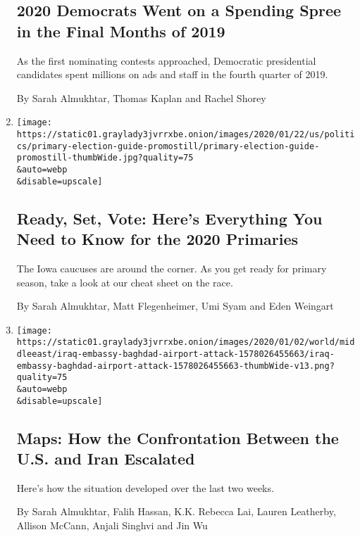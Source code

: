 \begin{enumerate}
  \hypertarget{2020-democrats-went-on-a-spending-spree-in-the-final-months-of-2019}{%
  \subsection{2020 Democrats Went on a Spending Spree in the Final
  Months of
  2019}\label{2020-democrats-went-on-a-spending-spree-in-the-final-months-of-2019}}

  As the first nominating contests approached, Democratic presidential
  candidates spent millions on ads and staff in the fourth quarter of
  2019.

  By Sarah Almukhtar, Thomas Kaplan and Rachel Shorey
\item
  \href{/interactive/2020/01/24/us/politics/presidential-primary-election-guide.html}{}

  \texttt{[image: https://static01.graylady3jvrrxbe.onion/images/2020/01/22/us/politics/primary-election-guide-promostill/primary-election-guide-promostill-thumbWide.jpg?quality=75\\\&auto=webp\\\&disable=upscale]}

  \hypertarget{ready-set-vote-heres-everything-you-need-to-know-for-the-2020-primaries}{%
  \subsection{Ready, Set, Vote: Here's Everything You Need to Know for
  the 2020
  Primaries}\label{ready-set-vote-heres-everything-you-need-to-know-for-the-2020-primaries}}

  The Iowa caucuses are around the corner. As you get ready for primary
  season, take a look at our cheat sheet on the race.

  By Sarah Almukhtar, Matt Flegenheimer, Umi Syam and Eden Weingart
\item
  \href{/interactive/2020/01/03/world/middleeast/iraq-embassy-baghdad-airport-attack.html}{}

  \texttt{[image: https://static01.graylady3jvrrxbe.onion/images/2020/01/02/world/middleeast/iraq-embassy-baghdad-airport-attack-1578026455663/iraq-embassy-baghdad-airport-attack-1578026455663-thumbWide-v13.png?quality=75\\\&auto=webp\\\&disable=upscale]}

  \hypertarget{maps-how-the-confrontation-between-the-us-and-iran-escalated}{%
  \subsection{Maps: How the Confrontation Between the U.S. and Iran
  Escalated}\label{maps-how-the-confrontation-between-the-us-and-iran-escalated}}

  Here's how the situation developed over the last two weeks.

  By Sarah Almukhtar, Falih Hassan, K.K. Rebecca Lai, Lauren Leatherby,
  Allison McCann, Anjali Singhvi and Jin Wu
\end{enumerate}

